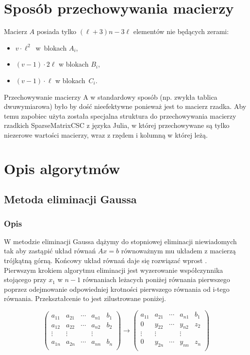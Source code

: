 \documentclass[12pt, a4paper]{article}
\begin{document}
\section{Sposób przechowywania macierzy}
Macierz $A$ posiada tylko $(\ell + 3)n - 3 \ell$ elementów nie będących zerami:
\begin{itemize}
\item $v \cdot \ell^2$~w~blokach $A_i$,
\item $(v-1) \cdot 2\ell$ w blokach $B_i$,
\item $(v-1) \cdot\ell$ w blokach~$C_i$.
\end{itemize}
Przechowywanie macierzy A w standardowy sposób (np. zwykła tablica dwuwymiarowa) było by dość nieefektywne ponieważ jest to macierz rzadka. Aby temu zapobiec użyta została specjalna struktura do przechowywania macierzy rzadkich SparseMatrixCSC z języka Julia, w której przechowywane są tylko niezerowe wartości macierzy, wraz z rzędem i kolumną w której leżą.

\section{Opis algorytmów}
\subsection{Metoda eliminacji Gaussa}
\subsubsection{Opis}

W metodzie  eliminacji Gaussa dążymy do stopniowej eliminacji niewiadomych tak aby zastąpić układ równań $Ax=b$ równoważnym mu układem z macierzą trójkątną górną. Końcowy układ równań daje się rozwiązać wprost .\\

\noindent Pierwszym krokiem algorytmu eliminacji jest wyzerowanie współczynnika stojącego przy $x_1$ w $n-1$ równaniach leżacych poniżej równania pierwszego poprzez odejmowanie odpowiedniej krotności pierwszego równania od i-tego równania. Przekształcenie to jest zilustrowane poniżej.

\begin{equation}
\left(\begin{array}{cccc|c}
a_{11} & a_{21} & \cdots & a_{n1} & b_1\\
a_{12} & a_{22} &\cdots & a_{n2} & b_2\\
\vdots &  \vdots& & \vdots  & \\
a_{1n} & a_{2n} &\cdots & a_{nn} & b_n\\
\end{array}\right)
\rightarrow
\left(\begin{array}{cccc|c}
a_{11} & a_{21} & \cdots & a_{n1} & b_1\\
0 & y_{22} &\cdots & y_{n2} & z_2\\
\vdots &  \vdots& & \vdots  & \\
0 & y_{2n} &\cdots & y_{nn} & z_n\\
\end{array}\right)
\end{equation} \\
\end{document}
